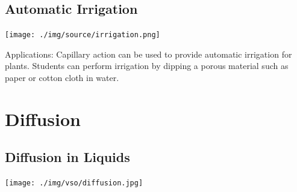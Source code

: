 \begin{multicols}{2}
\subsection{Automatic Irrigation}

\begin{center}
\texttt{[image: ./img/source/irrigation.png]}
\end{center}

\begin{description*}
\item[Applications:]{Capillary action can be used to provide automatic irrigation for plants. Students can perform irrigation by dipping a porous material such as paper or cotton cloth in water.}
\end{description*}

\columnbreak


\section*{Diffusion}

\subsection{Diffusion in Liquids}

\begin{center}
\texttt{[image: ./img/vso/diffusion.jpg]}
\end{center}


\end{multicols}
